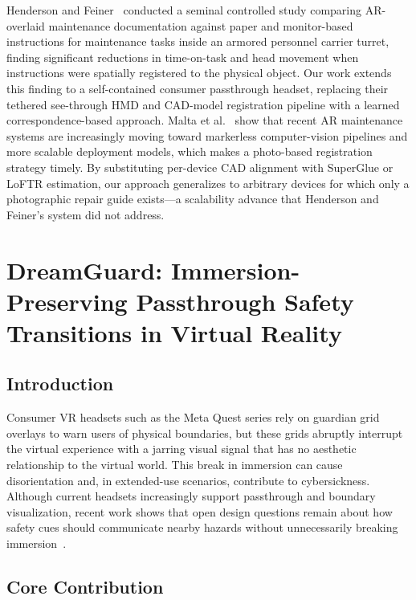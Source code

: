 \documentclass{styling/vgtc}                          %
\begin{document}
Henderson and Feiner~\cite{henderson:2011:ar} conducted a seminal controlled
study comparing AR-overlaid maintenance documentation against paper and
monitor-based instructions for maintenance tasks inside an armored personnel carrier turret, finding
significant reductions in time-on-task and head movement when instructions
were spatially registered to the physical object. Our work extends this
finding to a self-contained consumer passthrough headset, replacing their
tethered see-through HMD and CAD-model registration pipeline with a
learned correspondence-based approach. Malta et al.~\cite{malta2023maintenance}
show that recent AR maintenance systems are increasingly moving toward
markerless computer-vision pipelines and more scalable deployment models,
which makes a photo-based registration strategy timely. By substituting
per-device CAD alignment with SuperGlue or LoFTR estimation, our approach
generalizes to arbitrary devices for which only a photographic repair guide
exists---a scalability advance that Henderson and Feiner's system did not
address.

\section{DreamGuard: Immersion-Preserving Passthrough Safety Transitions in Virtual Reality}

\subsection{Introduction}

Consumer VR headsets such as the Meta Quest series rely on guardian grid
overlays to warn users of physical boundaries, but these grids abruptly
interrupt the virtual experience with a jarring visual signal that has no
aesthetic relationship to the virtual world. This break in immersion can
cause disorientation and, in extended-use scenarios, contribute to
cybersickness. Although current headsets increasingly support passthrough and
boundary visualization, recent work shows that open design questions remain
about how safety cues should communicate nearby hazards without unnecessarily
breaking immersion~\cite{qin2024brokenwall,wu2023guardian}.

\subsection{Core Contribution}
\end{document}
